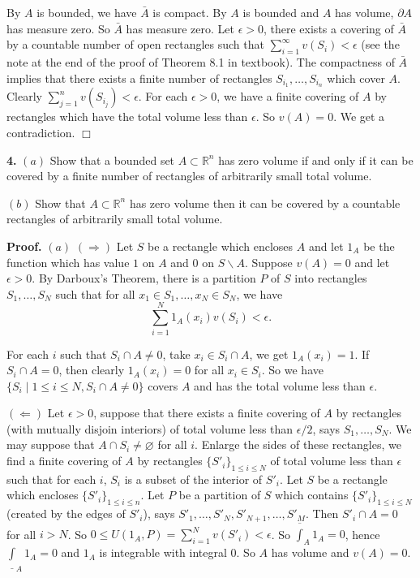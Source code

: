 \documentclass{article}
\begin{document}
By $A$ is bounded, we have $\bar{A}$ is compact. By $A$ is bounded and
$A$ has volume, $\partial A$ has measure zero. So $\bar{A}$ has measure
zero. Let $\epsilon > 0$, there exists a covering of $\bar{A}$ by a
countable number of open rectangles such that
$\sum_{i=1}^{\infty} v(S_i) < \epsilon$ (see the note at the end of the
proof of Theorem 8.1 in textbook). The compactness of $\bar{A}$ implies
that there exists a finite number of rectangles
$S_{i_1}, \ldots,S_{i_n}$ which cover $A$. Clearly
$\sum_{j=1}^n v(S_{i_j}) < \epsilon$. For each $\epsilon > 0$, we have a
finite covering of $A$ by rectangles which have the total volume less
than $\epsilon$. So $v(A) = 0$. We get a contradiction. $\Box$

    \textbf{4.} $(a)$ Show that a bounded set $A \subset \mathbb{R}^n$ has
zero volume if and only if it can be covered by a finite number of
rectangles of arbitrarily small total volume.

$(b)$ Show that $A\subset \mathbb{R}^n$ has zero volume then it can be
covered by a countable rectangles of arbitrarily small total volume.

    \textbf{Proof.} $(a)$ $(\Rightarrow)$ Let $S$ be a rectangle which
encloses $A$ and let $1_A$ be the function which has value $1$ on $A$
and $0$ on $S\backslash A$. Suppose $v(A) = 0$ and let $\epsilon >0$. By
Darboux's Theorem, there is a partition $P$ of $S$ into rectangles
$S_1,\ldots,S_N$ such that for all $x_1\in S_1,\ldots,x_N \in S_N$, we
have \[\sum_{i=1}^N 1_A (x_i) v(S_i)  < \epsilon.\]

For each $i$ such that $S_i \cap A \ne 0$, take $x_i \in S_i \cap A$, we
get $1_A(x_i) = 1$. If $S_i \cap A = 0$, then clearly $1_A(x_i) = 0$ for
all $x_i \in S_i$. So we have
$\{S_i \mid 1\le i \le N, S_i \cap A \ne 0\}$ covers $A$ and has the
total volume less than $\epsilon$.

$(\Leftarrow)$ Let $\epsilon > 0$, suppose that there exists a finite
covering of $A$ by rectangles (with mutually disjoin interiors) of total
volume less than $\epsilon/2$, says $S_1,\ldots, S_N$. We may suppose
that $A \cap S_i \ne \varnothing$ for all $i$. Enlarge the sides of
these rectangles, we find a finite covering of $A$ by rectangles
$\{S'_i\}_{1\le i \le N}$ of total volume less than $\epsilon$ such that
for each $i$, $S_i$ is a subset of the interior of $S'_i$. Let $S$ be a
rectangle which encloses $\{S'_i\}_{1\le i \le n}$. Let $P$ be a
partition of $S$ which contains $\{S'_i\}_{1\le i \le N}$ (created by
the edges of $S'_i$), says $S'_1,\ldots,S'_N,S'_{N+1},\ldots,S'_{M}$.
Then $S'_i \cap A = 0$ for all $i > N$. So
$0 \le U(1_A , P) = \sum_{i=1}^{N}v(S'_i) < \epsilon$. So
$\overline{\int}_A 1_A= 0$, hence $\underline{\int}_A 1_A = 0$ and $1_A$
is integrable with integral $0$. So $A$ has volume and $v(A) = 0$.
\end{document}
